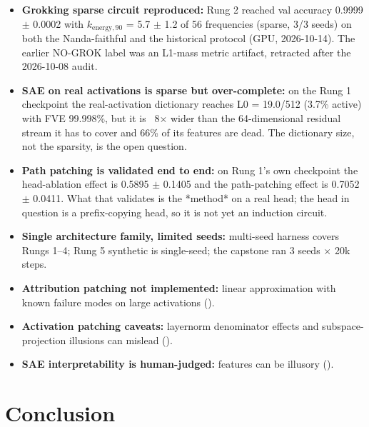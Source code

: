 \documentclass[11pt]{article}
\begin{document}
\begin{itemize}
    every ``$0 / N$'' figure was a statement about the detector. With the
    corrected detector the same run finds a prefix-copying head, and the
    dissociation probe says the copy follows the offset rather than the
    content.
  \item \textbf{Grokking sparse circuit reproduced:} Rung 2 reached val
    accuracy 0.9999 $\pm$ 0.0002 with $k_{\mathrm{energy},90}$ = 5.7 $\pm$
    1.2 of 56 frequencies (sparse, 3/3 seeds) on both the Nanda-faithful and
    the historical protocol (GPU, 2026-10-14). The earlier NO-GROK label was
    an L1-mass metric artifact, retracted after the 2026-10-08 audit.
  \item \textbf{SAE on real activations is sparse but over-complete:} on the
    Rung 1 checkpoint the real-activation dictionary reaches L0 = 19.0/512
    (3.7\% active) with FVE 99.998\%, but it is ~8$\times$ wider than the
    64-dimensional residual stream it has to cover and 66\% of its features
    are dead. The dictionary size, not the sparsity, is the open question.
  \item \textbf{Path patching is validated end to end:} on Rung 1's own
    checkpoint the head-ablation effect is 0.5895 $\pm$ 0.1405 and the
    path-patching effect is 0.7052 $\pm$ 0.0411. What that validates is the
    *method* on a real head; the head in question is a prefix-copying head,
    so it is not yet an induction circuit.
  \item \textbf{Single architecture family, limited seeds:} multi-seed
    harness covers Rungs 1--4; Rung 5 synthetic is single-seed; the
    capstone ran 3 seeds $\times$ 20k steps.
  \item \textbf{Attribution patching not implemented:} linear
    approximation with known failure modes on large activations
    (\citep{makelov2023subspace}).
  \item \textbf{Activation patching caveats:} layernorm denominator
    effects and subspace-projection illusions can mislead
    (\citep{makelov2023subspace}).
  \item \textbf{SAE interpretability is human-judged:} features can be
    illusory (\citep{makelov2023subspace}).
\end{itemize}

\section{Conclusion}
\label{sec:conclusion}
\end{document}
